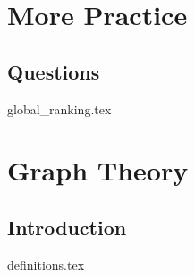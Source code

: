 \documentclass{exam}
\begin{document}
\section{More Practice}
\subsection{Questions}
\begin{questions}
{global_ranking.tex}
\end{questions}

\section{Graph Theory}
\subsection{Introduction}
\begin{questions}
{definitions.tex}
\end{questions}


\end{document}
